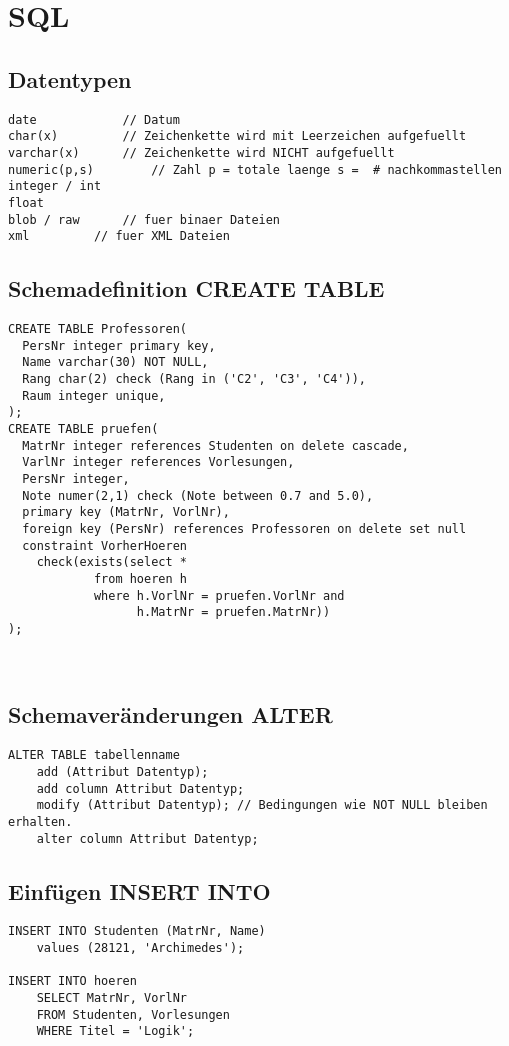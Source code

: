 \chapter{SQL}
\section{Datentypen}
\begin{lstlisting}
date			// Datum
char(x)			// Zeichenkette wird mit Leerzeichen aufgefuellt
varchar(x)		// Zeichenkette wird NICHT aufgefuellt
numeric(p,s)		// Zahl p = totale laenge s =  # nachkommastellen
integer / int
float
blob / raw		// fuer binaer Dateien
xml			// fuer XML Dateien
\end{lstlisting}

\section{Schemadefinition CREATE TABLE}
\begin{lstlisting}
CREATE TABLE Professoren(
  PersNr integer primary key,
  Name varchar(30) NOT NULL,
  Rang char(2) check (Rang in ('C2', 'C3', 'C4')),
  Raum integer unique,
);
CREATE TABLE pruefen(
  MatrNr integer references Studenten on delete cascade,
  VarlNr integer references Vorlesungen,
  PersNr integer,
  Note numer(2,1) check (Note between 0.7 and 5.0),
  primary key (MatrNr, VorlNr),
  foreign key (PersNr) references Professoren on delete set null
  constraint VorherHoeren
  	check(exists(select *
  			from hoeren h
  			where h.VorlNr = pruefen.VorlNr and
  			      h.MatrNr = pruefen.MatrNr))
);
\end{lstlisting}
\qquad \\
\section{Schemaveränderungen ALTER}
\begin{lstlisting}
ALTER TABLE tabellenname 
	add (Attribut Datentyp);
	add column Attribut Datentyp;
	modify (Attribut Datentyp); // Bedingungen wie NOT NULL bleiben erhalten.
	alter column Attribut Datentyp;
\end{lstlisting}

\section{Einfügen INSERT INTO}
\begin{lstlisting}
INSERT INTO Studenten (MatrNr, Name)
	values (28121, 'Archimedes');

INSERT INTO hoeren
	SELECT MatrNr, VorlNr
	FROM Studenten, Vorlesungen
	WHERE Titel = 'Logik';
\end{lstlisting}
\qquad\\
